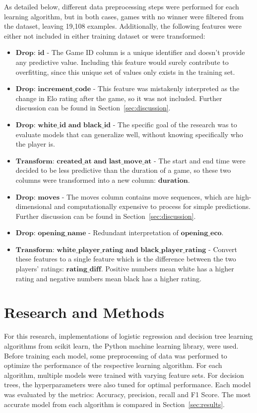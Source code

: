 \documentclass[12pt]{article}
\begin{document}
As detailed below, different data preprocessing steps were performed for each learning algorithm, but in both cases, games with no winner were filtered from the dataset, leaving 19,108 examples. Additionally, the following features were either not included in either training dataset or were transformed:

\begin{itemize}[label={}, leftmargin=0pt]
  \item $\textbf{Drop: id}$ - The Game ID column is a unique identifier and doesn’t provide any predictive value. Including this feature would surely contribute to overfitting, since this unique set of values only exists in the training set.
  \item $\textbf{Drop: increment\_code}$ - This feature was mistakenly interpreted as the change in Elo rating after the game, so it was not included. Further discussion can be found in Section~\ref{sec:discussion}.
  \item $\textbf{Drop: white\_id and black\_id}$ - The specific goal of the research was to evaluate models that can generalize well, without knowing specifically who the player is.
  \item $\textbf{Transform: created\_at and last\_move\_at}$ - The start and end time were decided to be less predictive than the duration of a game, so these two columns were transformed into a new column: $\textbf{duration}$.
  \item $\textbf{Drop: moves}$ - The moves column contains move sequences, which are high-dimensional and computationally expensive to process for simple predictions. Further discussion can be found in Section~\ref{sec:discussion}.
  \item $\textbf{Drop: opening\_name}$ - Redundant interpretation of $\textbf{opening\_eco}$.
  \item $\textbf{Transform: white\_player\_rating and black\_player\_rating}$ - Convert these features to a single feature which is the difference between the two players' ratings: $\textbf{rating\_diff}$. Positive numbers mean white has a higher rating and negative numbers mean black has a higher rating.
\end{itemize}

\section{Research and Methods}
For this research, implementations of logistic regression and decision tree learning algorithms from scikit learn, the Python machine learning library, were used. Before training each model, some preprocessing of data was performed to optimize the performance of the respective learning algorithm. For each algorithm, multiple models were trained with varying feature sets. For decision trees, the hyperparameters were also tuned for optimal performance. Each model was evaluated by the metrics: Accuracy, precision, recall and F1 Score. The most accurate model from each algorithm is compared in Section~\ref{sec:results}.
\end{document}
